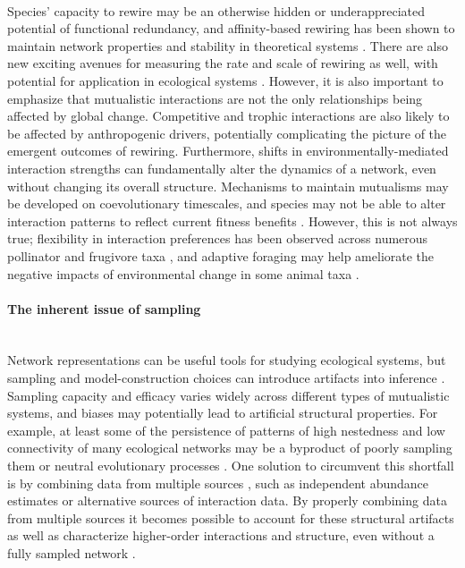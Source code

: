 \paragraph{}
Species' capacity to rewire may be an otherwise hidden or underappreciated potential of functional redundancy, and affinity-based rewiring has been shown to maintain network properties and stability in theoretical systems \parencite{sheykhali2020robustness}. There are also new exciting avenues for measuring the rate and scale of rewiring as well, with potential for application in ecological systems \parencite{han2019measuring}. However, it is also important to emphasize that mutualistic interactions are not the only relationships being affected by global change. Competitive and trophic interactions are also likely to be affected by anthropogenic drivers, potentially complicating the picture of the emergent outcomes of rewiring. Furthermore, shifts in environmentally-mediated interaction strengths can fundamentally alter the dynamics of a network, even without changing its overall structure.  Mechanisms to maintain mutualisms may be developed on coevolutionary timescales, and species may not be able to alter interaction patterns to reflect current fitness benefits \parencite{toby2010mutualisms}. However, this is not always true; flexibility in interaction preferences has been observed across numerous pollinator \parencite{moran2022flexible} and frugivore taxa \parencite{nowak2013specialist}, and adaptive foraging may help ameliorate the negative impacts of environmental change in some animal taxa \parencite{valdovinos2016niche}. 




\paragraph*{The inherent issue of sampling}\mbox{}\\
Network representations can be useful tools for studying ecological systems, but sampling and model-construction choices can introduce artifacts into inference \parencite{bluthgen2024critical, olesen2011missing, Young21}. Sampling capacity and efficacy varies widely across different types of mutualistic systems, and biases may potentially lead to artificial structural properties. For example, at least some of the persistence of patterns of high nestedness and low connectivity of many ecological networks may be a byproduct of poorly sampling them \parencite{bluthgen2024critical, bluthgen2008} or neutral evolutionary processes \parencite{Valverde2018}. One solution to circumvent this shortfall is by combining data from multiple sources \parencite{olesen2011missing, cirtwill2019quantitative}, such as independent abundance estimates or alternative sources of interaction data. By properly combining data from multiple sources it becomes possible to account for these structural artifacts as well as characterize higher-order interactions and structure, even without a fully sampled network \parencite{valdovinos2019mutualistic}. 



